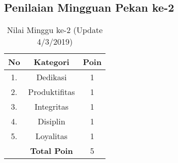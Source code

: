 \subsection{Penilaian Mingguan Pekan ke-2}

\begin{table}[h]
\centering
\caption{Nilai Minggu ke-2 (Update 4/3/2019)}
\label{tab:nm02}
\begin{tabular}{|c|c|c|}
\hline
\textbf{No} & \textbf{Kategori} & \textbf{Poin} \\ \hline
1. & Dedikasi & 1 \\ \hline
2. & Produktifitas & 1 \\ \hline
3. & Integritas & 1 \\ \hline
4. & Disiplin & 1 \\ \hline
5. & Loyalitas & 1 \\ \hline
 & \textbf{Total Poin} & 5 \\ \hline
\end{tabular}
\end{table}